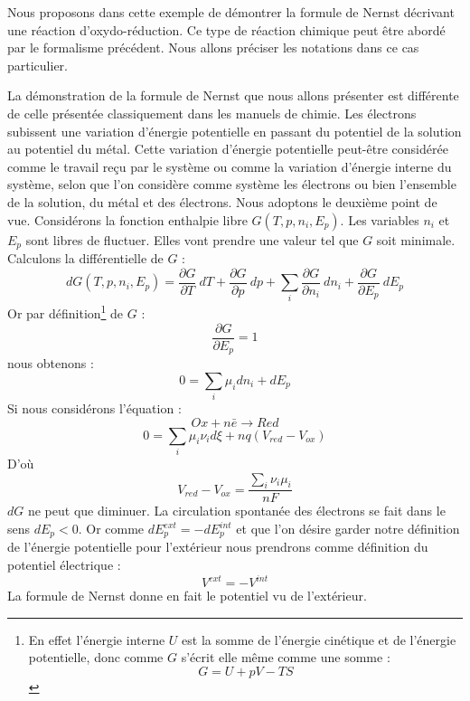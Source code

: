 \documentclass[12pt]{book}
\begin{document}
\begin{exmp}
Nous proposons dans cette exemple de d\'emontrer la formule de
Nernst
d\'ecrivant une r\'eaction
d'oxydo-r\'eduction. Ce type de r\'eaction 
chimique peut \^etre abord\'e par le formalisme pr\'ec\'edent. Nous
allons pr\'eciser les notations dans ce cas particulier.

La d\'emonstration de la formule de Nernst que nous allons pr\'esenter est
diff\'erente de celle pr\'esent\'ee classiquement dans les manuels de
chimie. Les \'electrons subissent une variation d'\'energie potentielle en
passant du potentiel de la solution au potentiel du m\'etal.
Cette variation d'\'energie potentielle peut-\^etre consid\'er\'ee
comme le 
travail re\c cu par le syst\`eme ou comme la variation d'\'energie
interne du 
syst\`eme, selon que l'on consid\`ere comme syst\`eme les \'electrons
ou bien 
l'ensemble de la solution, du m\'etal et des \'electrons. Nous adoptons le
deuxi\`eme point de vue.
Consid\'erons la fonction enthalpie libre $ G(T,p,n_i,E_p)$. Les
variables $n_i$ et $E_p$ sont libres de fluctuer. Elles vont prendre
une valeur tel que $G$ soit minimale. Calculons la diff\'erentielle de $G$
:
\begin{equation}
dG(T,p,n_i,E_p)=\frac{\partial G}{\partial T}\ dT +\frac{\partial
G}{\partial p}\ dp+\sum_i\frac{\partial G}{\partial n_i}\
dn_i+\frac{\partial G}{\partial E_p}\ dE_p
\end{equation}
Or par d\'efinition\footnote{%
En effet l'\'energie interne $U$ est la somme de l'\'energie
cin\'etique et 
de l'\'energie potentielle, donc comme $G$ s'\'ecrit elle m\^eme comme une
somme :
\begin{equation}
G=U+pV-TS
\end{equation}}
de $G$ :
\begin{equation}
\frac{\partial G}{\partial E_p}=1
\end{equation}
nous obtenons :
\begin{equation}
0=\sum_i\mu_idn_i+dE_p
\end{equation}
Si nous consid\'erons l'\'equation :
\begin{equation}
Ox+n\bar e\longrightarrow Red
\end{equation}
\begin{equation}
0=\sum_i \mu_i \nu_i d\xi +nq(V_{red}-V_{ox})
\end{equation}
D'o\`u 
\begin{equation}
V_{red}-V_{ox}=\frac{\sum_i\nu_i\mu_i}{nF}
\end{equation}
$dG$ ne peut que diminuer. La circulation spontan\'ee des \'electrons se
fait dans le sens $dE_p < 0$. Or comme $dE_p^{ext}=-dE_p^{int}$
et que 
l'on d\'esire garder notre d\'efinition de l'\'energie potentielle pour
l'ext\'erieur nous prendrons comme d\'efinition du potentiel
\'electrique : 
\begin{equation}
V^{ext}=-V^{int}
\end{equation}
La formule de Nernst donne en fait le potentiel vu de l'ext\'erieur.
\end{exmp}
\end{document}
